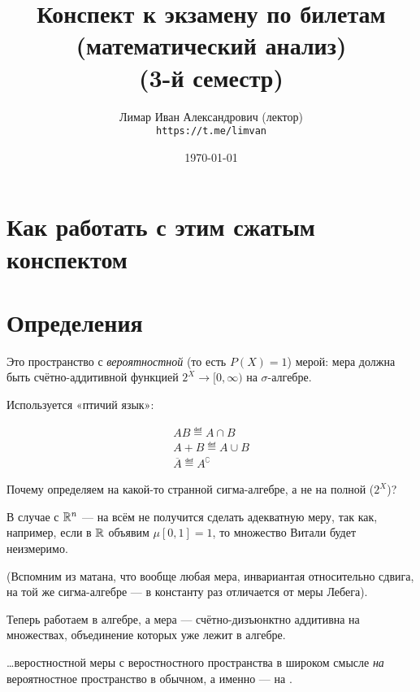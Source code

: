 \documentclass[12pt, a4paper, oneside]{article}
\title{Конспект к экзамену по билетам (математический анализ) \\(3-й семестр)}
\author{
  \vova
  \and
  Лимар Иван Александрович (лектор)\\
  \texttt{https://t.me/limvan}
}
\date{\today}
\begin{document}
\maketitle
\newpage
\tableofcontents
\newpage


\section{Как работать с этим сжатым конспектом}



\section{Определения}

\begin{definition}

    Это пространство с \textit{вероятностной} (то есть $P(X) = 1$) мерой: мера должна быть счётно-аддитивной функцией $2^X → [0, ∞)$ на $\sigma$-алгебре.
\end{definition}

Используется «птичий язык»:

\begin{gather*}
    AB \eqdef A \cap B \\
    A + B \eqdef A \cup B \\
    \overline{A} \eqdef A^{\complement}
\end{gather*}

Почему определяем на какой-то странной сигма-алгебре, а не на полной ($2^X$)?

В случае с ${\mathbb{R}}^n$ — на всём не получится сделать адекватную меру, так как, например,
если в ${\mathbb{R}}$ объявим $\mu [0, 1] = 1$, то множество Витали будет неизмеримо.

(Вспомним из матана, что вообще любая мера, инвариантая относительно сдвига,
на той же сигма-алгебре — в константу раз отличается от меры Лебега).

\begin{definition}

    Теперь работаем в алгебре, а мера — счётно-дизъюнктно аддитивна 
    на множествах, объединение которых уже лежит в алгебре.
\end{definition}


\begin{theorem}

    …веростностной меры с веростностного пространства в широком смысле
    \textit{на} вероятностное пространство в обычном, а именно — на .
\end{theorem}
\end{document}
